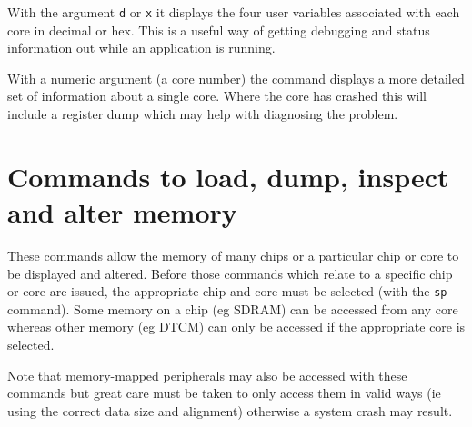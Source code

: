 \begin{itemize}
With the argument \texttt{d} or \texttt{x} it displays the four user
variables associated with each core in decimal or hex. This is a
useful way of getting debugging and status information out while an
application is running.

With a numeric argument (a core number) the command displays a more
detailed set of information about a single core. Where the core has
crashed this will include a register dump which may help with
diagnosing the problem.

\end{itemize}

\section{Commands to load, dump, inspect and alter memory}

These commands allow the memory of many chips or a particular chip or
core to be displayed and altered. Before those commands which relate
to a specific chip or core are issued, the appropriate chip and core
must be selected (with the \texttt{sp} command). Some memory on a chip
(eg SDRAM) can be accessed from any core whereas other memory (eg
DTCM) can only be accessed if the appropriate core is selected.

Note that memory-mapped peripherals may also be accessed with these
commands but great care must be taken to only access them in valid
ways (ie using the correct data size and alignment) otherwise a system
crash may result.

